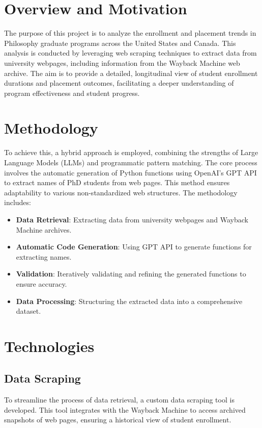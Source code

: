 \documentclass[11pt]{article}
\begin{document}
\section{Overview and Motivation}

The purpose of this project is to analyze the enrollment and placement trends in Philosophy graduate programs across the United States and Canada. This analysis is conducted by leveraging web scraping techniques to extract data from university webpages, including information from the Wayback Machine web archive. The aim is to provide a detailed, longitudinal view of student enrollment durations and placement outcomes, facilitating a deeper understanding of program effectiveness and student progress.

\section{Methodology}

To achieve this, a hybrid approach is employed, combining the strengths of Large Language Models (LLMs) and programmatic pattern matching. The core process involves the automatic generation of Python functions using OpenAI's GPT API to extract names of PhD students from web pages. This method ensures adaptability to various non-standardized web structures. The methodology includes:

\begin{itemize}
\item \textbf{Data Retrieval}: Extracting data from university webpages and Wayback Machine archives.
\item \textbf{Automatic Code Generation}: Using GPT API to generate functions for extracting names.
\item \textbf{Validation}: Iteratively validating and refining the generated functions to ensure accuracy.
\item \textbf{Data Processing}: Structuring the extracted data into a comprehensive dataset.
\end{itemize}

\section{Technologies}

\subsection{Data Scraping}

    To streamline the process of data retrieval, a custom data scraping tool is developed. This tool integrates with the Wayback Machine to access archived snapshots of web pages, ensuring a historical view of student enrollment.
\end{document}
